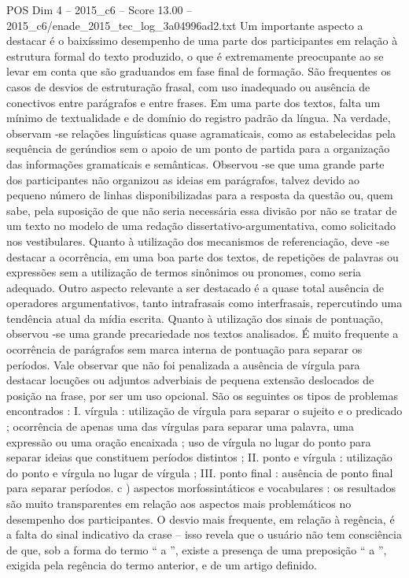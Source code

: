 \begin{textsample}{POS Dim 4 – 2015\_c6 – Score 13.00 – 2015\_c6/enade\_2015\_tec\_log\_3a04996ad2.txt}
Um importante aspecto a destacar é o baixíssimo desempenho de uma parte dos participantes em relação à estrutura formal do texto produzido, o que é extremamente preocupante ao se levar em conta que são graduandos em fase final de formação.
São frequentes os casos de desvios de estruturação frasal, com uso inadequado ou ausência de conectivos entre parágrafos e entre frases.
Em uma parte dos textos, falta um mínimo de textualidade e de domínio do registro padrão da língua.
Na verdade, observam -se relações linguísticas quase agramaticais, como as estabelecidas pela sequência de gerúndios sem o apoio de um ponto de partida para a organização das informações gramaticais e semânticas.
Observou -se que uma grande parte dos participantes não organizou as ideias em parágrafos, talvez devido ao pequeno número de linhas disponibilizadas para a resposta da questão ou, quem sabe, pela suposição de que não seria necessária essa divisão por não se tratar de um texto no modelo de uma redação dissertativo-argumentativa, como solicitado nos vestibulares.
Quanto à utilização dos mecanismos de referenciação, deve -se destacar a ocorrência, em uma boa parte dos textos, de repetições de palavras ou expressões sem a utilização de termos sinônimos ou pronomes, como seria adequado.
Outro aspecto relevante a ser destacado é a quase total ausência de operadores argumentativos, tanto intrafrasais como interfrasais, repercutindo uma tendência atual da mídia escrita.
Quanto à utilização dos sinais de pontuação, observou -se uma grande precariedade nos textos analisados.
É muito frequente a ocorrência de parágrafos sem marca interna de pontuação para separar os períodos.
Vale observar que não foi penalizada a ausência de vírgula para destacar locuções ou adjuntos adverbiais de pequena extensão deslocados de posição na frase, por ser um uso opcional.
São os seguintes os tipos de problemas encontrados : I. vírgula : utilização de vírgula para separar o sujeito e o predicado ; ocorrência de apenas uma das vírgulas para separar uma palavra, uma expressão ou uma oração encaixada ; uso de vírgula no lugar do ponto para separar ideias que constituem períodos distintos ; II. ponto e vírgula : utilização do ponto e vírgula no lugar de vírgula ; III. ponto final : ausência de ponto final para separar períodos. c ) aspectos morfossintáticos e vocabulares : os resultados são muito transparentes em relação aos aspectos mais problemáticos no desempenho dos participantes.
O desvio mais frequente, em relação à regência, é a falta do sinal indicativo da crase – isso revela que o usuário não tem consciência de que, sob a forma do termo “ a ”, existe a presença de uma preposição “ a ”, exigida pela regência do termo anterior, e de um artigo definido.

\end{textsample}
